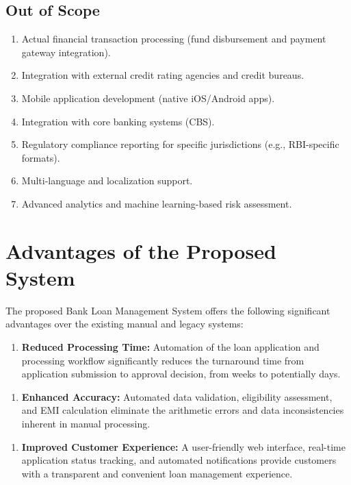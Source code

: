 \subsection{Out of Scope}

\begin{enumerate}
  \item Actual financial transaction processing (fund disbursement and payment gateway integration).
  \item Integration with external credit rating agencies and credit bureaus.
  \item Mobile application development (native iOS/Android apps).
  \item Integration with core banking systems (CBS).
  \item Regulatory compliance reporting for specific jurisdictions (e.g., RBI-specific formats).
  \item Multi-language and localization support.
  \item Advanced analytics and machine learning-based risk assessment.
\end{enumerate}

\section{Advantages of the Proposed System}

The proposed Bank Loan Management System offers the following significant advantages over the existing manual and legacy systems:

\begin{enumerate}
  \item \textbf{Reduced Processing Time:} Automation of the loan application and processing workflow significantly reduces the turnaround time from application submission to approval decision, from weeks to potentially days.
\end{enumerate}

\begin{enumerate}
  \item \textbf{Enhanced Accuracy:} Automated data validation, eligibility assessment, and EMI calculation eliminate the arithmetic errors and data inconsistencies inherent in manual processing.
\end{enumerate}

\begin{enumerate}
  \item \textbf{Improved Customer Experience:} A user-friendly web interface, real-time application status tracking, and automated notifications provide customers with a transparent and convenient loan management experience.
\end{enumerate}

